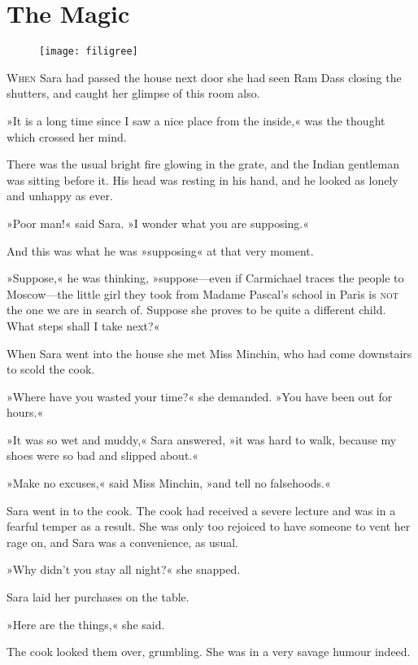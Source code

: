 \chapter{The Magic}

\begin{figure}[t!]
\centering
\texttt{[image: filigree]}
\end{figure}

\lettrine[lines=5]{W}{hen} Sara had passed the house next door she had seen Ram Dass closing the shutters, and caught her glimpse of this room also.

\zz
»It is a long time since I saw a nice place from the inside,« was the thought which crossed her mind.

\zz
There was the usual bright fire glowing in the grate, and the Indian gentleman was sitting before it. His head was resting in his hand, and he looked as lonely and unhappy as ever.

»Poor man!« said Sara. »I wonder what you are supposing.«

And this was what he was »supposing« at that very moment.

»Suppose,« he was thinking, »suppose—even if Carmichael traces the people to Moscow—the little girl they took from Madame Pascal's school in Paris is \textsc{not} the one we are in search of. Suppose she proves to be quite a different child. What steps shall I take next?«

When Sara went into the house she met Miss Minchin, who had come downstairs to scold the cook.

»Where have you wasted your time?« she demanded. »You have been out for hours.«

»It was so wet and muddy,« Sara answered, »it was hard to walk, because my shoes were so bad and slipped about.«

»Make no excuses,« said Miss Minchin, »and tell no falsehoods.«

Sara went in to the cook. The cook had received a severe lecture and was in a fearful temper as a result. She was only too rejoiced to have someone to vent her rage on, and Sara was a convenience, as usual.

»Why didn't you stay all night?« she snapped.

Sara laid her purchases on the table.

»Here are the things,« she said.

The cook looked them over, grumbling. She was in a very savage humour indeed.

